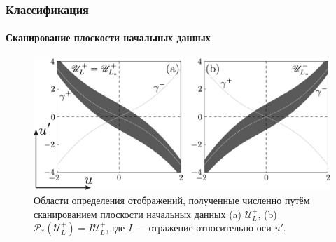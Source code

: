 \documentclass [10pt] {beamer}
\begin{document}
\begin{frame}
	\frametitle{Классификация}
	\framesubtitle{Сканирование плоскости начальных данных}
	
	\begin{figure}
		\includegraphics[width = \textwidth]{pic/Poincare map domain for piecewise singular equation.pdf}
		\caption{Области определения отображений, полученные численно путём сканированием плоскости начальных данных (a) $\mathscr{U}_L^+$, (b) $\mathcal{P}_*(\mathscr{U}_L^+) = I \mathscr{U}_L^+$, где $I$ --- отражение относительно оси $u'$.}
	\end{figure}
\end{frame}
\end{document}
